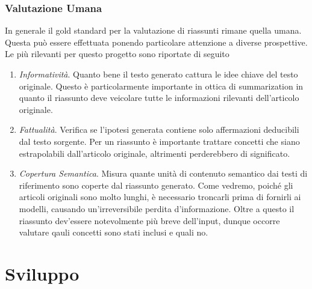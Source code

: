 \documentclass[12pt,a4paper,twoside,openright]{book}
\begin{document}
\subsection{Valutazione Umana}
In generale il gold standard per la valutazione di riassunti rimane quella umana. Questa può essere effettuata ponendo particolare attenzione a diverse prospettive. Le più rilevanti per questo progetto sono riportate di seguito
\begin{enumerate}
    \item \emph{Informatività}. Quanto bene il testo generato cattura le idee chiave del testo originale. Questo è particolarmente importante in ottica di summarization in quanto il riassunto deve veicolare tutte le informazioni rilevanti dell'articolo originale. 
    \item \emph{Fattualità}. Verifica se l'ipotesi generata contiene solo affermazioni deducibili dal testo sorgente. Per un riassunto è importante trattare concetti che siano estrapolabili dall'articolo originale, altrimenti perderebbero di significato.
    \item \emph{Copertura Semantica}. Misura quante unità di contenuto semantico dai testi di riferimento sono coperte dal riassunto generato. Come vedremo, poiché gli articoli originali sono molto lunghi, è necessario troncarli prima di fornirli ai modelli, causando un'irreversibile perdita d'informazione. Oltre a questo il riassunto dev'essere notevolmente più breve dell'input, dunque occorre valutare qauli concetti sono stati inclusi e quali no.
\end{enumerate}



































\chapter{Sviluppo}
\label{cap:sviluppo}
\end{document}
